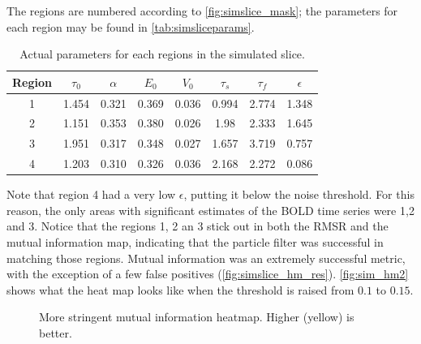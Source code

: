 The regions are numbered according to \autoref{fig:simslice_mask}; the parameters
for each region may be found in \autoref{tab:simsliceparams}.

\begin{table}[t]
\centering
\begin{tabular}{|c |c | c | c | c | c | c | c |}
\hline
Region & $\tau_0$ & $\alpha$ & $E_0$    & $V_0$    & $\tau_s$ & $\tau_f$ & $\epsilon$  \\
\hline
1 & 1.454& 0.321& 0.369& 0.036& 0.994& 2.774& 1.348\\
2 &1.151&  0.353& 0.380& 0.026& 1.98&  2.333& 1.645 \\
3 &1.951&  0.317& 0.348& 0.027& 1.657& 3.719& 0.757 \\
4 &1.203 & 0.310& 0.326& 0.036& 2.168& 2.272& 0.086\\
\hline
\end{tabular}
\caption{Actual parameters for each regions in the simulated slice.}
\label{tab:simsliceparams}
\end{table}

Note that region 4 had a very low $\epsilon$, putting it below the noise
threshold. For this reason, the only areas
with significant estimates of the \ac{BOLD} time series were 1,2 and 3.
Notice that the
regions 1, 2 an 3 stick out in both the \ac{RMSR} and the mutual information
map, indicating that the particle filter was successful in matching those regions.
Mutual information was an extremely successful metric, with the exception of
a few false positives (\autoref{fig:simslice_hm_res}). 
\autoref{fig:sim_hm2} shows what the heat map looks
like when the threshold is raised from $0.1$ to $0.15$.
\begin{figure}
\centering
{}
\caption{More stringent mutual information heatmap. Higher (yellow) is better.}
\label{fig:sim_hm2}
\end{figure}

